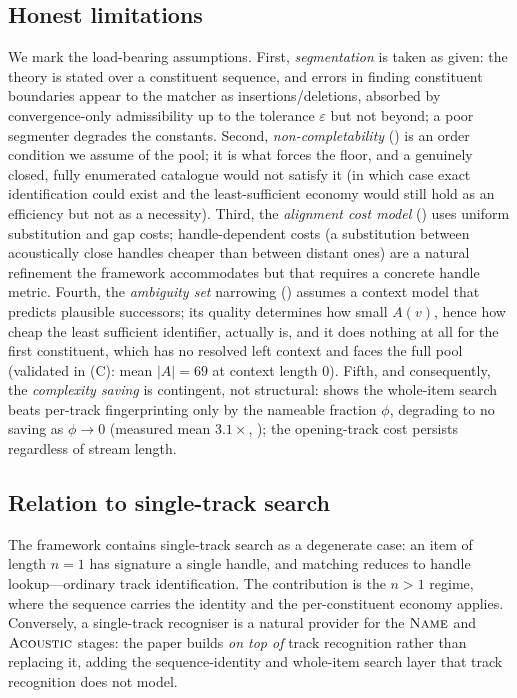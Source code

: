 \documentclass[11pt,twocolumn,a4paper]{article}
\theoremstyle{thmstyle}
\theoremstyle{definition}
\theoremstyle{remark}
\newcommand{\abs}[1]{\lvert#1\rvert}
\newcommand{\eps}{\varepsilon}
\begin{document}
\subsection{Honest limitations}

We mark the load-bearing assumptions. First, \emph{segmentation} is taken as
given: the theory is stated over a constituent sequence, and errors in finding
constituent boundaries appear to the matcher as insertions/deletions, absorbed by
convergence-only admissibility up to the tolerance $\eps$ but not beyond; a poor
segmenter degrades the constants. Second, \emph{non-completability}
() is an order condition we assume of the pool; it is
what forces the floor, and a genuinely closed, fully enumerated catalogue would
not satisfy it (in which case exact identification could exist and the
least-sufficient economy would still hold as an efficiency but not as a
necessity). Third, the \emph{alignment cost model} () uses
uniform substitution and gap costs; handle-dependent costs (a substitution
between acoustically close handles cheaper than between distant ones) are a
natural refinement the framework accommodates but that requires a concrete handle
metric. Fourth, the \emph{ambiguity set} narrowing () assumes
a context model that predicts plausible successors; its quality determines how
small $A(v)$, hence how cheap the least sufficient identifier, actually is, and it
does nothing at all for the first constituent, which has no resolved left context
and faces the full pool (validated in (C): mean $\abs{A}=69$
at context length $0$). Fifth, and consequently, the \emph{complexity saving} is
contingent, not structural:  shows the whole-item search beats
per-track fingerprinting only by the nameable fraction $\phi$, degrading to no
saving as $\phi\to0$ (measured mean $3.1\times$, ); the
opening-track cost persists regardless of stream length.

\subsection{Relation to single-track search}

The framework contains single-track search as a degenerate case: an item of
length $n=1$ has signature a single handle, and matching reduces to handle
lookup---ordinary track identification. The contribution is the $n>1$ regime,
where the sequence carries the identity and the per-constituent economy applies.
Conversely, a single-track recogniser is a natural provider for the
$\textsc{Name}$ and $\textsc{Acoustic}$ stages: the paper builds \emph{on top of}
track recognition rather than replacing it, adding the sequence-identity and
whole-item search layer that track recognition does not model.
\end{document}
